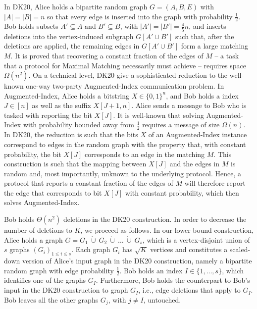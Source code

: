 \documentclass[11pt,a4paper]{article}
\begin{document}
In DK20, Alice holds a bipartite random graph $G=(A, B, E)$ with $|A| = |B| = n$ so that every edge is inserted into the graph with probability $\frac{1}{2}$. Bob holds subsets $A' \subseteq A$ and $B' \subseteq B$, with $|A'| = |B'| = \frac{4}{5} n$, and inserts deletions into the vertex-induced subgraph $G[A' \cup B']$ such that, after the deletions are applied, the remaining edges in $G[A' \cup B']$ form a large matching $M$. It is proved that recovering a constant fraction of the edges of $M$ -- a task that a protocol for \textsf{Maximal Matching} necessarily must achieve -- requires space $\Omega(n^2)$. On a technical level, DK20 give a sophisticated reduction to the well-known one-way two-party \textsf{Augmented-Index} communication problem. In \textsf{Augmented-Index}, Alice holds a bitstring $X \in \{0, 1\}^n$, and Bob holds a index $J \in [n]$ as well as the suffix $X[J+1, n]$. Alice sends a message to Bob who is tasked with reporting the bit $X[J]$. It is well-known that solving \textsf{Augmented-Index} with probability bounded away from $\frac{1}{2}$ requires a message of size $\Omega(n)$. In DK20, the reduction is such that the bits $X$ of an \textsf{Augmented-Index} instance correspond to edges in the random graph with the property that, with constant probability, the bit $X[J]$ corresponds to an edge in the matching $M$. This construction is such that the mapping between $X[J]$ and the edges in $M$ is random and, most importantly, unknown to the underlying protocol. Hence, a protocol that  reports a constant fraction of the edges of $M$ will therefore report the edge that corresponds to bit $X[J]$ with constant probability, which then solves \textsf{Augmented-Index}.

Bob holds $\Theta(n^2)$ deletions in the DK20 construction. In order to decrease the number of deletions to $K$, we proceed as follows. In our lower bound construction, Alice holds a graph $G=G_1 \ \dot{\cup} \ G_2 \  \dot{\cup} \ \dots \  \dot{\cup} \ G_s$, which is a vertex-disjoint union of $s$ graphs $(G_i)_{1 \le i \le s}$. Each graph $G_i$ has $\sqrt{K}$ vertices and constitutes a scaled-down version of Alice's input graph in the DK20 construction, namely a bipartite random graph with edge probability $\frac{1}{2}$. Bob holds an index $I \in \{1, \dots, s \}$, which identifies one of the graphs $G_I$. Furthermore, Bob holds the counterpart to Bob's input in the DK20 construction to graph $G_I$, i.e., edge deletions that apply to $G_I$. Bob leaves all the other graphs $G_j$, with $j \neq I$, untouched. 
\end{document}

